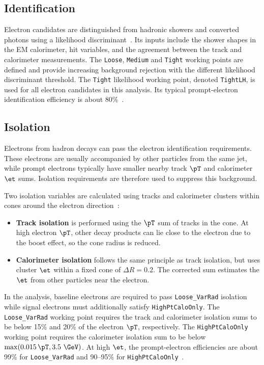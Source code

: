 \subsection{Identification}

Electron candidates are distinguished from hadronic showers and converted photons using a likelihood discriminant~\cite{ATLAS2019ElectronReco}.
Its inputs include the shower shapes in the EM calorimeter, hit variables, and the agreement between the track and calorimeter measurements.
The \texttt{Loose}, \texttt{Medium} and \texttt{Tight} working points are defined and provide increasing background rejection with the different likelihood discriminant threshold.
The \texttt{Tight} likelihood working point, denoted \texttt{TightLH}, is used for all electron candidates in this analysis.
Its typical prompt-electron identification efficiency is about 80\%~\cite{ATLAS2024ElectronPhotonEfficiencies}.

\subsection{Isolation}

Electrons from hadron decays can pass the electron identification requirements.
These electrons are usually accompanied by other particles from the same jet, while prompt electrons typically have smaller nearby track $\pT$ and calorimeter $\et$ sums.
Isolation requirements are therefore used to suppress this background.

Two isolation variables are calculated using tracks and calorimeter clusters within cones around the electron direction~\cite{ATLAS2019ElectronPerformance}:
\begin{itemize}
    \item \textbf{Track isolation} is performed using the $\pT$ sum of tracks in the cone. At high electron $\pT$, other decay products can lie close to the electron due to the boost effect, so the cone radius is reduced.
    \item \textbf{Calorimeter isolation} follows the same principle as track isolation, but uses cluster $\et$ within a fixed cone of $\Delta R=0.2$. The corrected sum estimates the $\et$ from other particles near the electron.
\end{itemize}
In the analysis, baseline electrons are required to pass \texttt{Loose\_VarRad} isolation while signal electrons must additionally satisfy \texttt{HighPtCaloOnly}.
The \texttt{Loose\_VarRad} working point requires the track and calorimeter isolation sums to be below 15\% and 20\% of the electron $\pT$, respectively.
The \texttt{HighPtCaloOnly} working point requires the calorimeter isolation sum to be below $\max(0.015\,\pT,3.5~\GeV)$.
At high $\et$, the prompt-electron efficiencies are about 99\% for \texttt{Loose\_VarRad} and 90--95\% for \texttt{HighPtCaloOnly}~\cite{ATLAS2024ElectronPhotonEfficiencies}.

